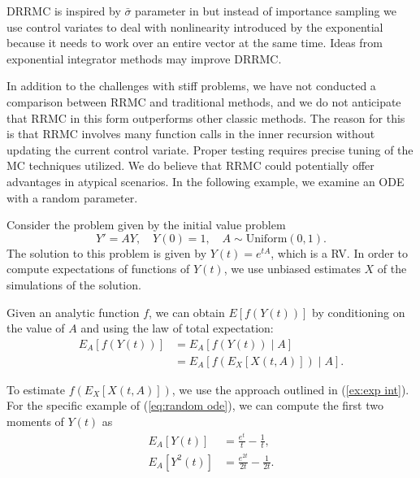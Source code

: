 \documentclass[a4paper,12pt]{article}
\begin{document}
\begin{example}[DRRMC]
\end{example}


\begin{related}[DRRMC]
    DRRMC is inspired by  $\bar{\sigma}$ parameter in \cite{sawhney_grid-free_2022} but
    instead of importance sampling we use control variates to deal with
    nonlinearity introduced by the exponential because it needs to work over
    an entire vector at the same time. Ideas from exponential integrator methods may
    improve DRRMC.
\end{related}

In addition to the challenges with stiff problems, we have not conducted
a comparison between RRMC and traditional methods, and we do not anticipate
that RRMC in this form outperforms other classic methods.
The reason for this is that RRMC involves
many function calls in the inner recursion without updating the current control
variate. Proper testing requires precise tuning of the MC techniques utilized.
We do believe that RRMC could potentially offer advantages in atypical scenarios.
In the following example, we examine an ODE with a random parameter.

\begin{example} \label{ex:random ode}
    Consider the problem given by the initial value problem
    \begin{equation}\label{eq:random ode}
        Y' = AY, \quad Y(0)=1, \quad A \sim \text{Uniform}(0,1).
    \end{equation}
    The solution to this problem is given by
    $Y(t) = e^{tA}$, which is a RV.
    In order to compute expectations of functions of $Y(t)$,
    we use unbiased estimates $X$ of the simulations of the solution.

    Given an analytic function $f$, we can obtain $E[f(Y(t))]$
    by conditioning on the value of $A$ and using the
    law of total expectation:
    \begin{align}
        E_A[f(Y(t))] & = E_A[f(Y(t)) \mid A]         \\
                     & = E_A[f(E_X[X(t,A)]) \mid A].
    \end{align}

    To estimate $f(E_X[X(t,A)])$, we use the approach outlined in
    (\ref{ex:exp int}). For the specific example of (\ref{eq:random ode}),
    we can compute the first two moments of $Y(t)$ as
    \begin{align}
        E_A[Y(t)]   & = \frac{e^t}{t} - \frac{1}{t},      \\
        E_A[Y^2(t)] & = \frac{e^{2t}}{2t} - \frac{1}{2t}.
    \end{align}
\end{example}
\end{document}
